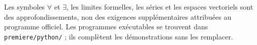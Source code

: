 Les symboles $\forall$ et $\exists$, les limites formelles, les séries et les
espaces vectoriels sont des approfondissements, non des exigences supplémentaires
attribuées au programme officiel. Les programmes exécutables se trouvent dans
\texttt{premiere/python/} ; ils complètent les démonstrations sans les remplacer.
